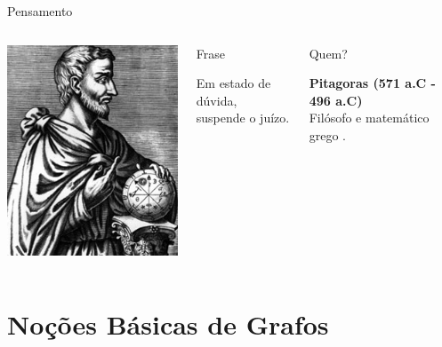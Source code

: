 \documentclass[xcolor=dvipsnames,table]{beamer}
\begin{document}
	\begin{frame}{Pensamento}
		\begin{columns}
		  		\begin{center}
		    		\includegraphics[width=.9\textwidth]{images/pitagoras.jpg}
		  		\end{center}
				\begin{block}{Frase}
					\begin{center}
						{\large Em estado de dúvida, \\suspende o juízo.}
					\end{center}
				\end{block}		  		
		  		\begin{block}{Quem?}
		  			\begin{center}
						{\bf Pitagoras (571 a.C - 496 a.C)} \\Filósofo e matemático grego .
					\end{center}
				\end{block}
		\end{columns}
	\end{frame}
	
    \section{Noções Básicas de Grafos}	
\end{document}
